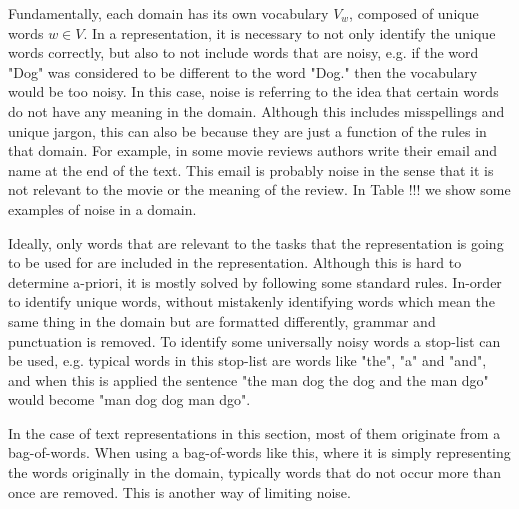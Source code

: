 
Fundamentally, each domain has its own vocabulary $V_w$, composed of unique words $w \in V$. In a representation, it is necessary to not only identify the unique words correctly, but also to not include words that are noisy, e.g. if the word "Dog" was considered to be different to the word "Dog." then the vocabulary would be too noisy. In this case, noise is referring to the idea that certain words do not have any meaning in the domain. Although this includes misspellings and unique jargon, this can also be because they  are just a function of the rules in that domain. For example, in some movie reviews authors write their email and name at the end of the text. This email is probably noise in the sense that it is not relevant to the movie or the meaning of the review. In Table !!! we show some examples of noise in a domain. %


 Ideally, only words that are relevant to the tasks that the representation is going to be used for are included in the representation. Although this is hard to determine a-priori, it is mostly solved by following some standard rules. In-order to identify unique words, without mistakenly identifying words which mean the same thing in the domain but are formatted differently, grammar and punctuation is removed. To identify some universally noisy words a stop-list can be used, e.g. typical words in this stop-list are words like "the", "a" and "and", and when this is applied the sentence "the man dog the dog and the man dgo" would become "man dog dog man dgo". %

In the case of  text representations in this section, most of them originate from a bag-of-words. When using a bag-of-words like this, where it is simply representing the words originally in the domain, typically words that do not occur more than once are removed. This is another way of limiting noise. %


